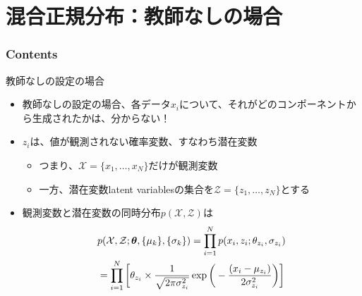 \documentclass[aspectratio=169,unicode,dvipdfmx,14pt]{beamer}
\begin{document}
\section{混合正規分布：教師なしの場合}

\begin{frame}\frametitle{Contents}
\Large \tableofcontents[currentsection]
\end{frame}


\begin{frame}{教師なしの設定の場合}
\vspace{-.05in}
\begin{itemize}
\item 教師なしの設定の場合、各データ$x_i$について、それがどのコンポーネントから生成されたかは、分からない！
\item $z_i$は、値が観測されない確率変数、すなわち潜在変数
\begin{itemize}
\item つまり、$\mathcal{X} = \{ x_1, \ldots, x_N \}$だけが観測変数
\item 一方、潜在変数latent variablesの集合を$\mathcal{Z} = \{ z_1, \ldots, z_N \}$とする
\end{itemize}
\item 観測変数と潜在変数の同時分布$p(\mathcal{X}, \mathcal{Z})$は
\vspace{-.13in}
\begin{align}
& p(\mathcal{X}, \mathcal{Z};\bm{\theta},\{ \mu_k \}, \{ \sigma_k \})
= \prod_{i=1}^N p(x_i, z_i ; \theta_{z_i}, \sigma_{z_i})
\notag \\ &
= \prod_{i=1}^N \bigg[ \theta_{z_i} \times \frac{1}{\sqrt{2\pi\sigma_{z_i}^2}}\exp\bigg( - \frac{(x_i - \mu_{z_i})}{2\sigma_{z_i}^2} \bigg) \bigg]
\end{align}
\end{itemize}
\end{frame}
\end{document}
